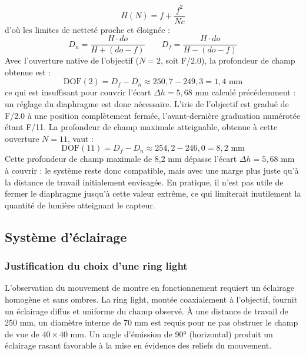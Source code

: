 \begin{equation}
    H(N) = f + \frac{f^2}{Nc}
    \label{eq:hyperfocale}
\end{equation}
\noindent d'où les limites de netteté proche et éloignée :
\begin{equation}
    D_n = \frac{H \cdot do}{H + (do - f)}
    \qquad
    D_f = \frac{H \cdot do}{H - (do - f)}
    \label{eq:limites_nettete}
\end{equation}
Avec l'ouverture native de l'objectif ($N = 2$, soit F/2.0), la profondeur de champ obtenue est :
\begin{equation}
    \text{DOF}(2) = D_f - D_n \approx 250,7 - 249,3 = 1,4 \text{ mm}
    \label{eq:dof_f2}
\end{equation}
\noindent ce qui est insuffisant pour couvrir l'écart $\Delta h = 5,68$ mm calculé précédemment : un réglage du diaphragme est donc nécessaire.
L'iris de l'objectif est gradué de F/2.0 à une position complètement fermée, l'avant-dernière graduation numérotée étant F/11.
La profondeur de champ maximale atteignable, obtenue à cette ouverture $N = 11$, vaut :
\begin{equation}
    \text{DOF}(11) = D_f - D_n \approx 254,2 - 246,0 = 8,2 \text{ mm}
    \label{eq:dof_f11}
\end{equation}
\noindent Cette profondeur de champ maximale de 8,2 mm dépasse l'écart $\Delta h = 5,68$ mm à couvrir : le système reste donc compatible, mais avec une marge plus juste qu'à la distance de travail initialement envisagée.
En pratique, il n'est pas utile de fermer le diaphragme jusqu'à cette valeur extrême, ce qui limiterait inutilement la quantité de lumière atteignant le capteur.

\subsection{Système d'éclairage}
\label{sec:dim-eclairage}
\subsubsection{Justification du choix d'une ring light}
L'observation du mouvement de montre en fonctionnement requiert un éclairage homogène et sans ombres. 
La ring light, montée coaxialement à l'objectif, fournit un éclairage diffus et uniforme du champ observé. 
À une distance de travail de 250 mm, un diamètre interne de 70 mm est requis pour ne pas obstruer le champ de vue de $40 \times 40$ mm.
Un angle d'émission de 90° (horizontal) produit un éclairage rasant favorable à la mise en évidence des reliefs du mouvement.
